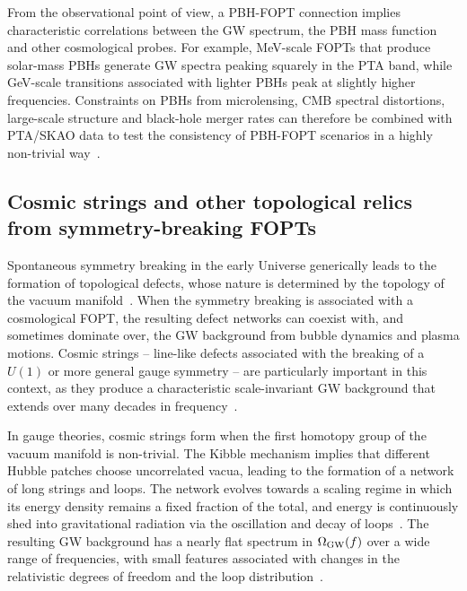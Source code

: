 \documentclass[a4paper,11pt]{article}
\begin{document}
From the observational point of view, a PBH-FOPT connection implies characteristic correlations between the GW spectrum, 
the PBH mass function and other cosmological probes. For example, MeV-scale FOPTs that produce solar-mass PBHs generate 
GW spectra peaking squarely in the PTA band, while GeV-scale transitions associated with lighter PBHs peak at slightly 
higher frequencies. Constraints on PBHs from microlensing, CMB spectral distortions, large-scale structure and 
black-hole merger rates can therefore be combined with PTA/SKAO data to test the consistency of PBH-FOPT scenarios 
in a highly non-trivial way~\citep{Carr:2020PBHReview,Gouttenoire:2024PBH,Baker:2025PBHPT,Flores:2024Revisit}.

\subsection{Cosmic strings and other topological relics from symmetry-breaking FOPTs}
\label{sec:strings}

Spontaneous symmetry breaking in the early Universe generically leads to the formation of topological defects, 
whose nature is determined by the topology of the vacuum manifold~\citep{Kibble:1976sj,Vilenkin:2000jqa}. 
When the symmetry breaking is associated with a cosmological FOPT, the resulting defect networks can coexist with, 
and sometimes dominate over, the GW background from bubble dynamics and plasma motions. Cosmic strings -- line-like 
defects associated with the breaking of a $U(1)$ or more general gauge symmetry -- are particularly important 
in this context, as they produce a characteristic scale-invariant GW background that extends over many decades 
in frequency~\citep{Vilenkin:2000jqa,Sousa:2024CSGW}.

In gauge theories, cosmic strings form when the first homotopy group of the vacuum manifold is non-trivial. 
The Kibble mechanism implies that different Hubble patches choose uncorrelated vacua, leading to the formation 
of a network of long strings and loops. The network evolves towards a scaling regime in which its energy density 
remains a fixed fraction of the total, and energy is continuously shed into gravitational radiation via 
the oscillation and decay of loops~\citep{Kibble:1976sj,Vilenkin:2000jqa,Damour:2000wa,Damour:2001bk,Bohe:2011rk}. 
The resulting GW background has a nearly flat spectrum in $\Omega_{\rm GW}(f)$ over a wide range of frequencies, 
with small features associated with changes in the relativistic degrees of freedom and the loop distribution~\citep{BlancoPillado:2018ael}.
\end{document}
